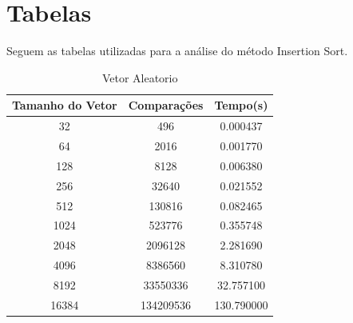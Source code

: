 \documentclass[12pt,a4paper,twoside]{report}
\begin{document}
\chapter{Tabelas}

Seguem as tabelas utilizadas para a análise do método Insertion Sort.

\begin{table}[h]
  \centering
  \caption{Vetor Aleatorio \label{tab:aleatorio}}
  \begin{tabular}{ccc} \\\hline
  \textbf{Tamanho do Vetor} & \textbf{Comparações} & \textbf{Tempo(s)} \\\hline
  32                        & 496                  & 0.000437          \\\hline
  64                        & 2016                 & 0.001770          \\\hline
  128                       & 8128                 & 0.006380          \\\hline
  256                       & 32640                & 0.021552          \\\hline
  512                       & 130816               & 0.082465          \\\hline
  1024                      & 523776               & 0.355748          \\\hline
  2048                      & 2096128              & 2.281690          \\\hline
  4096                      & 8386560              & 8.310780         \\\hline
  8192                      & 33550336             & 32.757100         \\\hline
  16384                     & 134209536            & 130.790000       \\\hline
  \end{tabular}
\end{table}
\end{document}
